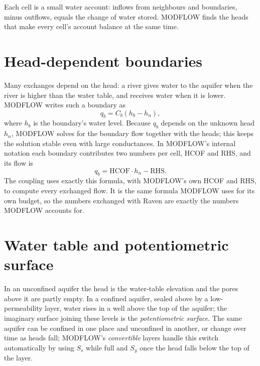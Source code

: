 \begin{plain}
Each cell is a small water account: inflows from neighbours and boundaries, minus outflows, equals the change of water
stored. MODFLOW finds the heads that make every cell's account balance at the same time.
\end{plain}

\section{Head-dependent boundaries}
Many exchanges depend on the head: a river gives water to the aquifer when the river is higher than the water table,
and receives water when it is lower. MODFLOW writes such a boundary as
\begin{equation}
q_b = C_b\left(h_b-h_n\right),
\end{equation}
where $h_b$ is the boundary's water level. Because $q_b$ depends on the unknown head $h_n$, MODFLOW solves for the
boundary flow together with the heads; this keeps the solution stable even with large conductances. In MODFLOW's
internal notation each boundary contributes two numbers per cell, HCOF and RHS, and its flow is
\begin{equation}
q_b = \mathrm{HCOF}\cdot h_n-\mathrm{RHS}.
\end{equation}
The coupling uses exactly this formula, with MODFLOW's own HCOF and RHS, to compute every exchanged flow. It is the same
formula MODFLOW uses for its own budget, so the numbers exchanged with Raven are exactly the numbers MODFLOW accounts for.

\section{Water table and potentiometric surface}
In an unconfined aquifer the head is the water-table elevation and the pores above it are partly empty. In a confined
aquifer, sealed above by a low-permeability layer, water rises in a well above the top of the aquifer; the imaginary
surface joining these levels is the \emph{potentiometric surface}. The same aquifer can be confined in one place and
unconfined in another, or change over time as heads fall; MODFLOW's \emph{convertible} layers handle this switch
automatically by using $S_s$ while full and $S_y$ once the head falls below the top of the layer.

